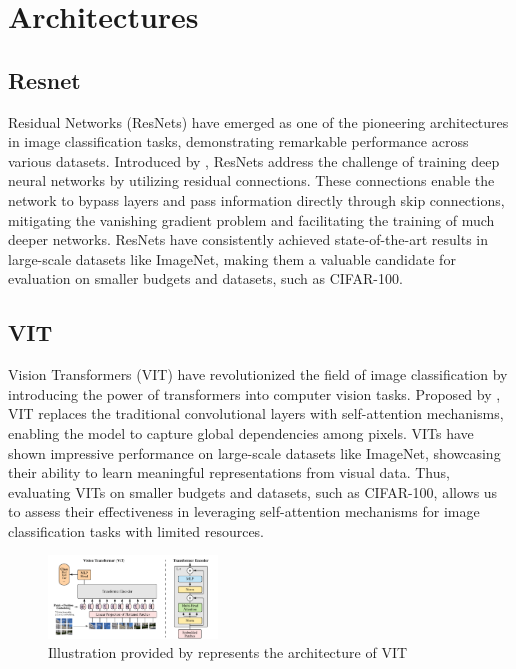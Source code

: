 \documentclass{article}
\begin{document}
\section{Architectures}

\subsection{Resnet}
Residual Networks (ResNets) have emerged as one of the pioneering architectures in image classification tasks, demonstrating remarkable performance across various datasets. Introduced by \cite{he2016deep}, ResNets address the challenge of training deep neural networks by utilizing residual connections. These connections enable the network to bypass layers and pass information directly through skip connections, mitigating the vanishing gradient problem and facilitating the training of much deeper networks. ResNets have consistently achieved state-of-the-art results in large-scale datasets like ImageNet, making them a valuable candidate for evaluation on smaller budgets and datasets, such as CIFAR-100.

\subsection{VIT}
Vision Transformers (VIT) have revolutionized the field of image classification by introducing the power of transformers into computer vision tasks. Proposed by \cite{DBLP:journals/corr/abs-2010-11929}, VIT replaces the traditional convolutional layers with self-attention mechanisms, enabling the model to capture global dependencies among pixels. VITs have shown impressive performance on large-scale datasets like ImageNet, showcasing their ability to learn meaningful representations from visual data. Thus, evaluating VITs on smaller budgets and datasets, such as CIFAR-100, allows us to assess their effectiveness in leveraging self-attention mechanisms for image classification tasks with limited resources.

\begin{figure}[ht]
    \vskip 0.2in
    \centering
    \includegraphics[width=0.4\textwidth]{vit.png}
    \caption{Illustration provided by \cite{DBLP:journals/corr/abs-2010-11929} represents the architecture of VIT}
    \label{fig:foobar}
    \vskip -0.2in
\end{figure}
\end{document}
